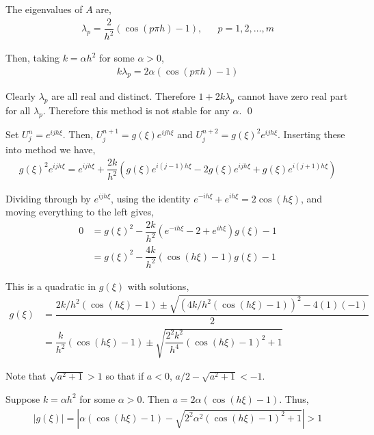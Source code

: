 \documentclass[10pt]{article}
\begin{document}
\begin{solution}[Solution]
\begin{enumerate}[label=(\alph*)]
    The eigenvalues of \( A \) are,
    \begin{align*}
        \lambda_p = \dfrac{2}{h^2}(\cos(p\pi h)-1), && p=1,2,\ldots, m
    \end{align*}

    Then, taking \( k = \alpha h^2 \) for some \( \alpha > 0 \),
    \begin{align*}
        k\lambda_p = 2\alpha(\cos(p\pi h)-1)
    \end{align*}

    Clearly \( \lambda_p \) are all real and distinct. Therefore \( 1 + 2k\lambda_p \) cannot have zero real part for all \( \lambda_p \).  Therefore this method is not stable for any \( \alpha \). \qed

    Set \( U_j^n = e^{ijh\xi} \). Then, \( U_j^{n+1} = g(\xi)e^{ijh\xi} \) and \( U_j^{n+2} = g(\xi)^2e^{ijh\xi} \). Inserting these into method we have,
    \begin{align*}
        g(\xi)^2e^{ijh\xi} = e^{ijh\xi} + \dfrac{2k}{h^2}\left( g(\xi)e^{i(j-1)h\xi} - 2g(\xi)e^{ijh\xi} + g(\xi)e^{i(j+1)h\xi} \right)
    \end{align*}

    Dividing through by \( e^{ijh\xi} \), using the identity \( e^{-ih\xi} + e^{ih\xi} = 2\cos(h\xi) \), and moving everything to the left gives,
    \begin{align*}
        0 &= g(\xi)^2 - \dfrac{2k}{h^2}\left( e^{-ih\xi} - 2 + e^{ih\xi} \right)g(\xi) - 1
        \\&= g(\xi)^2 - \dfrac{4k}{h^2}(\cos(h\xi)-1)g(\xi) - 1
    \end{align*}

    This is a quadratic in \( g(\xi) \) with solutions,
    \begin{align*}
        g(\xi) &= \dfrac{2k/h^2(\cos(h\xi)-1) \pm \sqrt{(4k/h^2(\cos(h\xi)-1))^2-4(1)(-1)}}{2}
        \\&= \dfrac{k}{h^2}(\cos(h\xi)-1) \pm \sqrt{\dfrac{2^2k^2}{h^4}(\cos(h\xi)-1)^2+1}
    \end{align*}

    Note that \( \sqrt{a^2+1} > 1 \) so that if \( a < 0 \), \( a/2 - \sqrt{a^2+1} < -1 \).

    Suppose \( k = \alpha h^2 \) for some \( \alpha > 0 \). Then \( a = 2\alpha(\cos(h\xi)-1) \). 
    Thus,
    \begin{align*}
        |g(\xi)| = \left|\alpha(\cos(h\xi)-1) - \sqrt{2^2\alpha^2 (\cos(h\xi)-1)^2+1}\right| > 1
    \end{align*}


\end{enumerate}
\end{solution}
\end{document}
